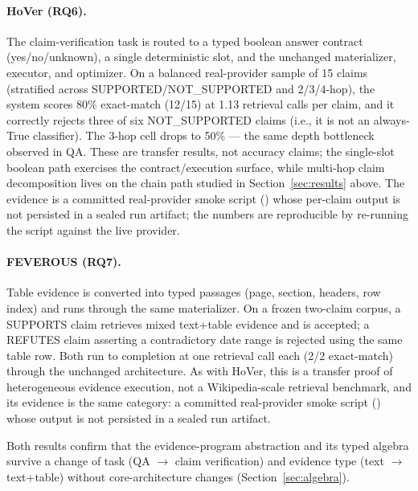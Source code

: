 \paragraph{HoVer (RQ6).} The claim-verification task is routed to a typed
boolean answer contract (yes/no/unknown), a single deterministic
 slot, and the unchanged materializer,
executor, and optimizer. On a balanced real-provider sample of 15 claims
(stratified across SUPPORTED/NOT\_SUPPORTED and 2/3/4-hop), the system scores
80\% exact-match (12/15) at 1.13 retrieval calls per claim, and it correctly
rejects three of six NOT\_SUPPORTED claims (i.e., it is not an always-True
classifier). The 3-hop cell drops to 50\% --- the same depth bottleneck
observed in QA. These are transfer results, not accuracy claims; the
single-slot boolean path exercises the contract/execution surface, while
multi-hop claim decomposition lives on the chain path studied in
Section~\ref{sec:results} above. The evidence is a committed real-provider
smoke script () whose per-claim output is
not persisted in a sealed run artifact; the numbers are reproducible by
re-running the script against the live provider.

\paragraph{FEVEROUS (RQ7).} Table evidence is converted into typed
 passages (page, section, headers, row index) and runs through
the same materializer. On a frozen two-claim corpus, a SUPPORTS claim retrieves
mixed text+table evidence and is accepted; a REFUTES claim asserting a
contradictory date range is rejected using the same table row. Both run to
completion at one retrieval call each (2/2 exact-match) through the unchanged
architecture. As with HoVer, this is a transfer proof of heterogeneous evidence
execution, not a Wikipedia-scale retrieval benchmark, and its evidence is the
same category: a committed real-provider smoke script
() whose output is not persisted in a
sealed run artifact.

Both results confirm that the evidence-program abstraction and its typed
algebra survive a change of task (QA $\to$ claim verification) and evidence
type (text $\to$ text+table) without core-architecture changes
(Section~\ref{sec:algebra}).



